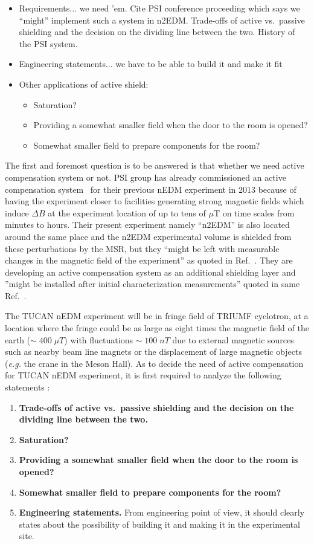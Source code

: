 \begin{itemize}
\item Requirements... we need 'em.  Cite PSI conference proceeding which says we ``might'' implement such a system in n2EDM.  Trade-offs of active vs.~passive shielding and the decision on the dividing line between the two.  History of the PSI system.
\item Engineering statements...  we have to be able to build it and make it fit
\item Other applications of active shield:
\begin{itemize}
\item Saturation?
\item Providing a somewhat smaller field when the door to the room is opened?
\item Somewhat smaller field to prepare components for the room?
\end{itemize}
\end{itemize}

The first and foremost question is to be answered is that whether we need active compensation system or not. PSI group has already commissioned an active compensation system~\cite{bea_paper} for their previous nEDM experiment in 2013 because of having the experiment closer to facilities generating strong magnetic fields which induce $\Delta B$ at the experiment location of up to tens of $\mu$T on time scales from minutes to hours. Their present experiment namely ``n2EDM'' is also located around the same place and the n2EDM experimental volume is shielded from these perturbations by the MSR, but they ``might be left with measurable changes in the magnetic field of the experiment'' as quoted in Ref.~\cite{psi_n2edm_PPNS-workshop}. They are developing an active compensation system as an additional shielding layer and ''might be installed after initial characterization measurements'' quoted in same Ref.~\cite{psi_n2edm_PPNS-workshop}. 

The TUCAN nEDM experiment will be in fringe field of TRIUMF cyclotron, at a location where the fringe could be as large as eight times the magnetic field of the earth ($\sim\;400\;\mu T$) with fluctuations $\sim\;100\;nT$ due to external magnetic sources such as nearby beam line magnets or the displacement of large magnetic objects ({\it e.g.} the crane in the Meson Hall). As to decide the need of active compensation for TUCAN nEDM experiment, it is first required to analyze the following statements :
\begin{enumerate}
    \item {\bf Trade-offs of active vs.~passive shielding and the decision on the dividing line between the two.}
    \item {\bf Saturation?}
    \item {\bf Providing a somewhat smaller field when the door to the room is opened?}
    \item {\bf Somewhat smaller field to prepare components for the room?}
    \item {\bf Engineering statements.} From engineering point of view, it should clearly states about the possibility of building it and making it in the experimental site.
\end{enumerate}


